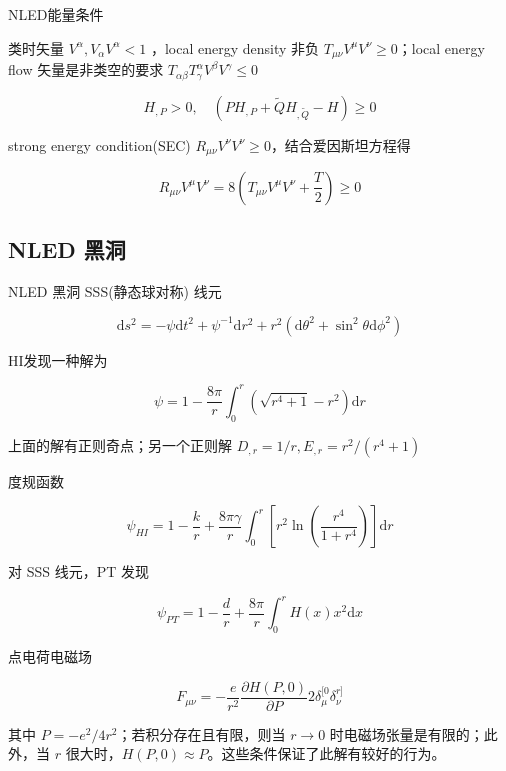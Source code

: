 \documentclass[9pt, dvipsnames]{beamer} %
\begin{document}
\begin{frame}{NLED能量条件}

    类时矢量 $V^\alpha,V_\alpha V^\alpha<1 $ ，local energy density 非负 $T_{\mu\nu}V^\mu V^\nu\geqslant 0 $；local energy flow 矢量是非类空的要求 $T_{\alpha\beta}T_\gamma^\alpha V^\beta V^\gamma\leqslant 0 $

    $$
    H_{,P}>0,\quad
    \left(P H_{,P} + \tilde{Q} H_{,\tilde{Q}} - H \right) \geqslant 0
    $$
    
    strong energy condition(SEC) $R_{\mu\nu}V^\nu V^\nu\geqslant 0 $，结合爱因斯坦方程得
    
    $$
    R_{\mu\nu}V^\mu V^\nu 
    =8\left(T_{\mu\nu} V^\mu V^\nu + \frac{T }{2 }  \right) \geqslant 0
    $$
    
\end{frame}

\subsection{NLED 黑洞}

\begin{frame}{NLED 黑洞}
    SSS(静态球对称) 线元

    $$
    \mathrm{d}s^2 = -\psi\mathrm{d}t^2 + \psi^{-1} \mathrm{d}r^2 + r^2\left(\mathrm{d}\theta^2+\sin^2\theta\mathrm{d}\phi^2 \right)
    $$
    
    HI发现一种解为
    
    $$
    \psi
    =1-\frac{8\pi }{r } \int_{0}^{r} \left(\sqrt{r^4+1} - r^2 \right)\mathrm{d}r
    $$
    
    上面的解有正则奇点；另一个正则解 $D_{,r}=1/r,E_{,r}=r^2/\left(r^4+1 \right) $
    
    度规函数
    
    $$
    \psi_{HI}
    =1-\frac{k }{r } + \frac{8\pi\gamma }{r } \int_{0}^{r} \left[r^2\ln\left(\frac{r^4 }{1+r^4 }  \right) \right] \mathrm{d}r
    $$

    
\end{frame}

\begin{frame}
    对 SSS 线元，PT 发现

    $$
    \psi_{PT}
    =1-\frac{d }{r } + \frac{8\pi }{r } \int_{0}^{r} H(x) x^2\mathrm{d}x
    $$

    点电荷电磁场

$$
F_{\mu\nu}
=-\frac{e }{r^2 } \frac{\partial H(P,0) }{\partial P } 2\delta_\mu^{[0}\delta_{\nu}^{r]}
$$

其中 $P=-e^2/4r^2$；若积分存在且有限，则当 $r\to 0$ 时电磁场张量是有限的；此外，当 $r$ 很大时，$H(P,0)\approx P$。这些条件保证了此解有较好的行为。

\end{frame}
\end{document}
